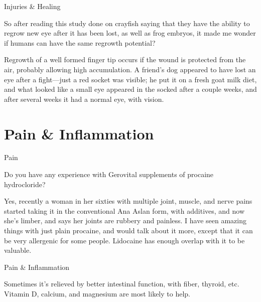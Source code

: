 \documentclass[11pt,oneside,openany,extrafontsizes]{memoir}
\begin{document}
\begin{qaexchange}{Injuries \& Healing}

    \begin{question}
        So after reading this study done on crayfish saying that they have the ability to regrow new eye after it has been lost, as well as frog embryos, it made me wonder if humans can have the same regrowth potential?
    \end{question}

    \begin{answer}
      Regrowth of a well formed finger tip occurs if the wound is protected from the air, probably allowing high  accumulation. A friend's dog appeared to have lost an eye after a fight—just a red socket was visible; he put it on a fresh goat milk diet, and what looked like a small eye appeared in the socked after a couple weeks, and after several weeks it had a normal eye, with vision.
    \end{answer}
\end{qaexchange}

\section{Pain \& Inflammation}

\begin{qaexchange}{Pain}

    \begin{question}
        Do you have any experience with Gerovital supplements of procaine hydrocloride?
    \end{question}

    \begin{answer}
      Yes, recently a woman in her sixties with multiple joint, muscle, and nerve pains started taking it in the conventional Ana Aslan form, with additives, and now she's limber, and says her joints are rubbery and painless. I have seen amazing things with just plain procaine, and would talk about it more, except that it can be very allergenic for some people. Lidocaine has enough overlap with it to be valuable.
    \end{answer}
\end{qaexchange}

\begin{standalonequote}{Pain \& Inflammation}

    \begin{answer}
      Sometimes it's relieved by better intestinal function, with fiber, thyroid, etc. Vitamin D, calcium, and magnesium are most likely to help.
    \end{answer}
\end{standalonequote}
\end{document}
